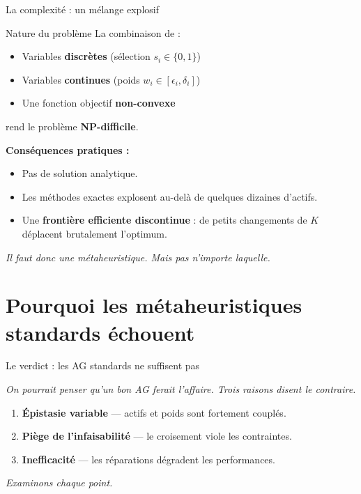 \documentclass[10pt,aspectratio=169]{beamer}
\begin{document}
\begin{frame}{La complexité : un mélange explosif}
\begin{block}{Nature du problème}
La combinaison de :
\begin{itemize}
  \item Variables \textbf{discrètes} (sélection $s_i \in \{0,1\}$)
  \item Variables \textbf{continues} (poids $w_i \in [\epsilon_i, \delta_i]$)
  \item Une fonction objectif \textbf{non-convexe}
\end{itemize}
rend le problème \textcolor{dangerred}{\textbf{NP-difficile}}.
\end{block}

\vspace{0.3cm}
\textbf{Conséquences pratiques :}
\begin{itemize}
  \item Pas de solution analytique.
  \item Les méthodes exactes explosent au-delà de quelques dizaines d'actifs.
  \item Une \textbf{frontière efficiente discontinue} : de petits changements de $K$ déplacent brutalement l'optimum.
\end{itemize}

\vspace{0.3cm}
\centering
\textit{Il faut donc une métaheuristique. Mais pas n'importe laquelle.}
\end{frame}

\section{Pourquoi les métaheuristiques standards échouent}

\begin{frame}{Le verdict : les AG standards ne suffisent pas}
\begin{center}
\textit{On pourrait penser qu'un bon AG ferait l'affaire. Trois raisons disent le contraire.}
\end{center}

\vspace{0.3cm}
\begin{enumerate}
  \item \textbf{\textcolor{dangerred}{Épistasie variable}} — actifs et poids sont fortement couplés.
  \item \textbf{\textcolor{dangerred}{Piège de l'infaisabilité}} — le croisement viole les contraintes.
  \item \textbf{\textcolor{dangerred}{Inefficacité}} — les réparations dégradent les performances.
\end{enumerate}

\vspace{0.4cm}
\centering
\textit{Examinons chaque point.}
\end{frame}
\end{document}
